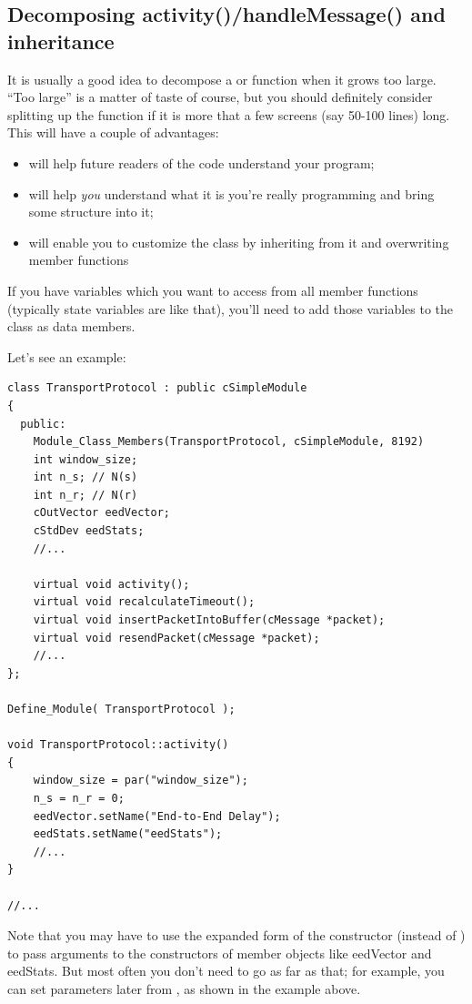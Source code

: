 \subsection{Decomposing activity()/handleMessage() and inheritance}

It is usually a good idea to decompose a  or
 function when it grows too large. ``Too
large'' is a matter of taste of course, but you should definitely
consider splitting up the function if it is more that a few screens
(say 50-100 lines) long. This will have a couple of advantages:
\begin{itemize}
\item{will help future readers of the code understand your program;}
\item{will help \textit{you} understand what it is you're really programming
and bring some structure into it;}
\item{will enable you to customize the class by inheriting from it and
    overwriting member functions}
\end{itemize}

If you have variables which you want to access from all member
functions (typically state variables are like that), you'll need to
add those variables to the class as data members.

Let's see an example:

\begin{verbatim}
class TransportProtocol : public cSimpleModule
{
  public:
    Module_Class_Members(TransportProtocol, cSimpleModule, 8192)
    int window_size;
    int n_s; // N(s)
    int n_r; // N(r)
    cOutVector eedVector;
    cStdDev eedStats;
    //...

    virtual void activity();
    virtual void recalculateTimeout();
    virtual void insertPacketIntoBuffer(cMessage *packet);
    virtual void resendPacket(cMessage *packet);
    //...
};

Define_Module( TransportProtocol );

void TransportProtocol::activity()
{
    window_size = par("window_size");
    n_s = n_r = 0;
    eedVector.setName("End-to-End Delay");
    eedStats.setName("eedStats");
    //...
}

//...
\end{verbatim}

\begin{sloppypar}
  Note that you may have to use the expanded form of the
  constructor (instead of
  ) to pass arguments to the constructors
  of member objects like eedVector and eedStats. But most often you
  don't need to go as far as that; for example, you can set parameters
  later from , as shown in the example above.
\end{sloppypar}

